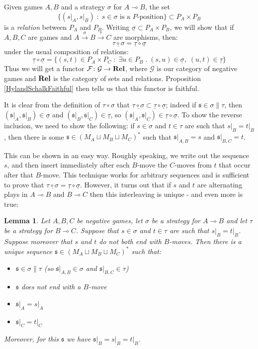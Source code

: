 \documentclass[11pt]{article} %
\theoremstyle{plain} %
\newtheorem{lemma}[theorem]{Lemma}
\theoremstyle{definition} %
\theoremstyle{exercisestyle}
\newcommand{\catname}[1]{{\normalfont\textbf{#1}}}
\newcommand{\Rel}{\catname{Rel}}
\newcommand{\map}[3]{#2\xrightarrow{#1} #3}
\newcommand*\from{\colon}
\newcommand{\cmap}[3]{#1\from{}#2\to{}#3}
\renewcommand{\implies}{\multimap}
\newcommand{\comp}[2]{#1 \circ #2}
\newcommand{\cprd}{\sqcup}
\newcommand{\G}{\mathcal G}
\newcommand{\suchthat}{\;\colon\;}
\newcommand{\esuchthat}{\;.\;}
\newcommand{\F}{\mathcal F}
\newcommand{\s}{\mathfrak s}
\newcommand{\grel}[1]{\underline{#1}}
\begin{document}
Given games $A,B$ and a strategy $\sigma$ for $A\implies B$, the set
\[
  \{(s\vert_A,s\vert_B)\suchthat \textrm{$s\in\sigma$ is a $P$-position}\}\subset P_A\times P_B
  \]
is a \emph{relation} between $P_A$ and $P_B$.  Writing $\grel\sigma\subset P_A\times P_B$, we will show that if $A,B,C$ are games and $A\xrightarrow{\sigma}\map{\tau}{B}{C}$ are morphisms, then:
\[
  \grel{\comp\tau\sigma}=\comp{\grel\tau}{\grel\sigma}
  \]
under the usual composition of relations:
\[
  \comp{\grel\tau}{\grel\sigma} = \{(s,t)\in P_A\times P_C\suchthat \exists u\in P_B\esuchthat (s,u)\in\grel\sigma,\;(u,t)\in\grel\tau\}
  \]
Thus we will get a functor $\cmap{\F}{\G}{\Rel}$, where $\G$ is our category of negative games and $\Rel$ is the category of sets and relations.  Proposition \ref{HylandSchalkFaithful} then tells us that this functor is faithful.  

It is clear from the definition of $\comp\tau\sigma$ that $\grel{\comp\tau\sigma}\subset\comp{\grel\tau}{\grel\sigma}$; indeed if $\s\in\sigma\|\tau$, then $(\s\vert_A,\s\vert_B)\in\grel\sigma$ and $(\s\vert_B,\s\vert_C)\in\grel\tau$, so $(\s\vert_A,\s\vert_C)\in\comp{\grel\tau}{\grel\sigma}$.  To show the reverse inclusion, we need to show the following: if $s\in\sigma$ and $t\in\tau$ are such that $s\vert_B=t\vert_B$, then there is some $\s\in (M_A\cprd M_B\cprd M_C)^*$ such that $\s\vert_{A,B}=s$ and $\s\vert_{B,C}=t$.  

This can be shown in an easy way.  Roughly speaking, we write out the sequence $s$, and then insert immediately after each $B$-move the $C$-moves from $t$ that occur after that $B$-move.  This technique works for arbitrary sequences and is sufficient to prove that $\grel{\comp\tau\sigma}=\comp{\grel\tau}{\grel\sigma}$.  However, it turns out that if $s$ and $t$ are alternating plays in $A\implies B$ and $B\implies C$ then this interleaving is unique - and even more is true:

\begin{lemma}
  \label{LiftingLemma}
  Let $A,B,C$ be negative games, let $\sigma$ be a strategy for $A\implies B$ and let $\tau$ be a strategy for $B\implies C$.  Suppose that $s\in\sigma$ and $t\in\tau$ are such that $s\vert_B=t\vert_B$.  Suppose moreover that $s$ and $t$ do not both end with $B$-moves.  Then there is a unique sequence $\s\in(M_A\cprd M_B\cprd M_C)^*$ such that:
  \begin{itemize}
    \item $\s\in\sigma\|\tau$ (so $\s\vert_{A,B}\in\sigma$ and $\s\vert_{B,C}\in\tau$)
    \item $\s$ does not end with a $B$-move
    \item $\s\vert_A=s\vert_A$
    \item $\s\vert_C=t\vert_C$
  \end{itemize}
  Moreover, for this $\s$ we have $\s\vert_B=s\vert_B=t\vert_B$.
\end{lemma}
\end{document}
